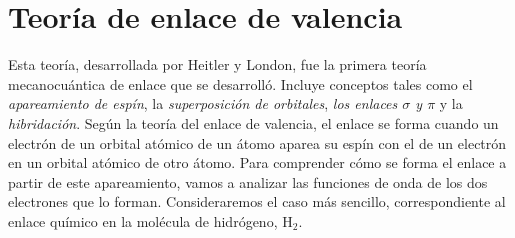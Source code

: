 \documentclass{tufte-handout}
\begin{document}
%

\section{Teoría de enlace de valencia}
Esta teoría, desarrollada por Heitler y London, fue la primera
teoría mecanocuántica de enlace que se desarrolló. Incluye 
conceptos tales como el \textit{apareamiento de espín}, 
la \textit{superposición de orbitales}, 
\textit{los enlaces $\sigma$ y $\pi$} y la
\textit{hibridación}.
Según la teoría del enlace de valencia, el enlace se forma 
cuando un electrón de un orbital atómico de un átomo aparea su 
espín con el de un electrón en un orbital atómico de otro átomo.
Para comprender cómo se forma el enlace a partir de este
apareamiento, vamos a analizar las funciones de onda de los 
dos electrones que lo forman. Consideraremos el caso más
sencillo, correspondiente al enlace químico 
en la molécula de hidrógeno, H$_2$.
\end{document}
